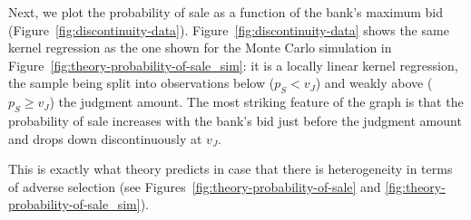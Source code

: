 \documentclass[11pt,twopage]{article}
\begin{document}
Next, we plot the probability of sale as a function of the bank's
maximum bid (Figure~\ref{fig:discontinuity-data}). Figure~\ref{fig:discontinuity-data} shows the same kernel regression as the one shown for the Monte Carlo simulation in Figure~\ref{fig:theory-probability-of-sale_sim}: it is a locally linear kernel regression, the sample being split into observations below ($p_S<v_J$) and weakly above ($p_S\geq v_J$) the judgment amount. The most
striking feature of the graph is that the probability of sale
increases with the bank's bid just before the judgment amount and drops down discontinuously at $v_J$. 


This is exactly what theory predicts in
case that there is heterogeneity in terms of adverse selection (see
Figures~\ref{fig:theory-probability-of-sale} and \ref{fig:theory-probability-of-sale_sim}).


\end{document}
